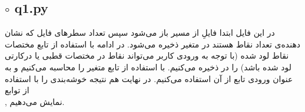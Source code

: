 \documentclass[a4paper,12pt]{article}
\begin{document}
\subsection*{$\circ$ q1.py}
در این فایل ابتدا فایلِ  
از مسیر 
باز می‌شود سپس تعداد سطرهای فایل که نشان دهنده‌ی تعداد نقاط هستند در متغیر 
ذخیره می‌شود. در ادامه با استفاده از تابع 
مختصات نقاط لود شده (با توجه به ورودی کاربر می‌تواند نقاط در مختصات قطبی یا درکارتی لود شده باشد) را در 
ذخیره می‌کنیم. با استفاده از تابع 
متغیر 
را محاسبه می‌کنیم و به عنوان ورودی تابع
از آن استفاده می‌کنیم. در نهایت هم نتیجه خوشه‌بندی را با استفاده از توابع \\
,
نمایش می‌دهیم.	
\end{document}
